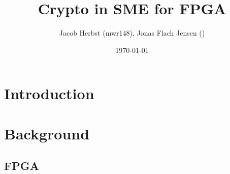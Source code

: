 \documentclass[a4paper]{article}
\author{Jacob Herbst (mwr148), Jonas Flach Jensen ()}
\date{\today}
\title{Crypto in SME for FPGA}
\begin{document}
\maketitle
\tableofcontents

\newpage
\section{Introduction}
\label{sec:orge7f229a}

\section{Background}
\label{sec:orga206965}

\subsection{FPGA}
\label{sec:orgcccb15d}
\end{document}
